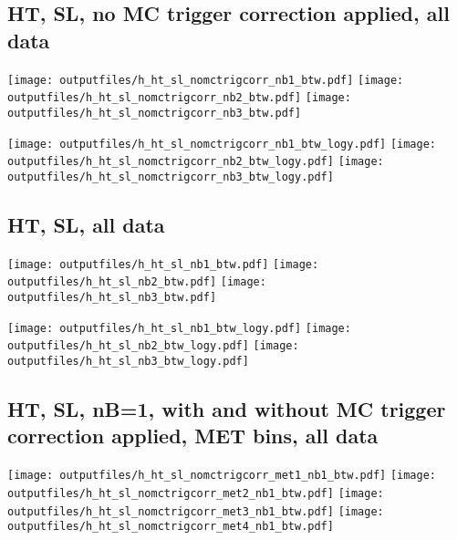 \documentclass[11pt]{article}
\begin{document}
     \subsection{ HT, SL, no MC trigger correction applied, all data}

    \noindent
     \texttt{[image: outputfiles/h\_ht\_sl\_nomctrigcorr\_nb1\_btw.pdf]}
     \texttt{[image: outputfiles/h\_ht\_sl\_nomctrigcorr\_nb2\_btw.pdf]}
     \texttt{[image: outputfiles/h\_ht\_sl\_nomctrigcorr\_nb3\_btw.pdf]}

    \noindent
     \texttt{[image: outputfiles/h\_ht\_sl\_nomctrigcorr\_nb1\_btw\_logy.pdf]}
     \texttt{[image: outputfiles/h\_ht\_sl\_nomctrigcorr\_nb2\_btw\_logy.pdf]}
     \texttt{[image: outputfiles/h\_ht\_sl\_nomctrigcorr\_nb3\_btw\_logy.pdf]}



    \subsection{ HT, SL, all data}

    \noindent
     \texttt{[image: outputfiles/h\_ht\_sl\_nb1\_btw.pdf]}
     \texttt{[image: outputfiles/h\_ht\_sl\_nb2\_btw.pdf]}
     \texttt{[image: outputfiles/h\_ht\_sl\_nb3\_btw.pdf]}

    \noindent
     \texttt{[image: outputfiles/h\_ht\_sl\_nb1\_btw\_logy.pdf]}
     \texttt{[image: outputfiles/h\_ht\_sl\_nb2\_btw\_logy.pdf]}
     \texttt{[image: outputfiles/h\_ht\_sl\_nb3\_btw\_logy.pdf]}


     \subsection{ HT, SL, nB=1, with and without MC trigger correction applied, MET bins, all data}

    \noindent
     \texttt{[image: outputfiles/h\_ht\_sl\_nomctrigcorr\_met1\_nb1\_btw.pdf]}
     \texttt{[image: outputfiles/h\_ht\_sl\_nomctrigcorr\_met2\_nb1\_btw.pdf]}
     \texttt{[image: outputfiles/h\_ht\_sl\_nomctrigcorr\_met3\_nb1\_btw.pdf]}
     \texttt{[image: outputfiles/h\_ht\_sl\_nomctrigcorr\_met4\_nb1\_btw.pdf]}
\end{document}
